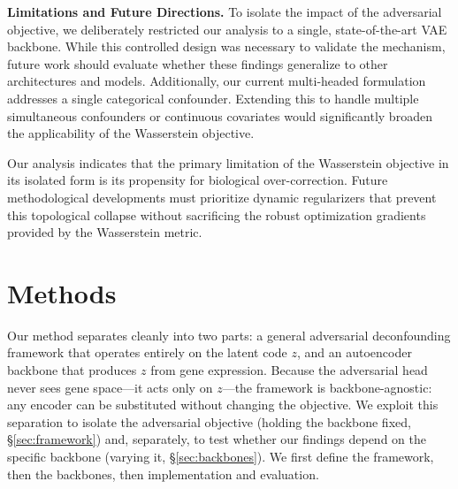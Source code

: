\documentclass[unnumsec,webpdf,contemporary,large]{oup-authoring-template}%
\theoremstyle{thmstyleone}%
\theoremstyle{thmstyletwo}%
\theoremstyle{thmstylethree}%
\begin{document}
\textbf{Limitations and Future Directions.} To isolate the impact of the adversarial objective, we deliberately restricted our analysis to a single, state-of-the-art VAE backbone. While this controlled design was necessary to validate the mechanism, future work should evaluate whether these findings generalize to other architectures and models. Additionally, our current multi-headed formulation addresses a single categorical confounder. Extending this to handle multiple simultaneous confounders or continuous covariates would significantly broaden the applicability of the Wasserstein objective.

Our analysis indicates that the primary limitation of the Wasserstein objective in its isolated form is its propensity for biological over-correction. Future methodological developments must prioritize dynamic regularizers that prevent this topological collapse without sacrificing the robust optimization gradients provided by the Wasserstein metric.

\section{Methods}
Our method separates cleanly into two parts: a general adversarial deconfounding framework that operates entirely on the latent code $z$, and an autoencoder backbone that produces $z$ from gene expression. Because the adversarial head never sees gene space---it acts only on $z$---the framework is backbone-agnostic: any encoder can be substituted without changing the objective. We exploit this separation to isolate the adversarial objective (holding the backbone fixed, \S\ref{sec:framework}) and, separately, to test whether our findings depend on the specific backbone (varying it, \S\ref{sec:backbones}). We first define the framework, then the backbones, then implementation and evaluation.
\end{document}
